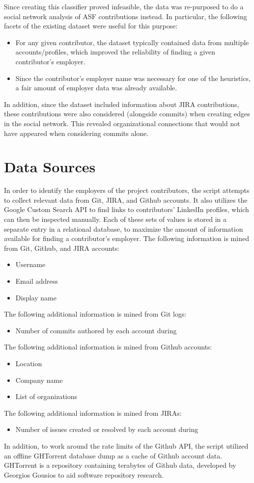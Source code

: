 Since creating this classifier proved infeasible, the data was re-purposed to do a social network analysis of ASF contributions instead. In particular, the following facets of the existing dataset were useful for this purpose:
\begin{itemize}
	\item For any given contributor, the dataset typically contained data from multiple accounts/profiles, which improved the reliability of finding a given contributor's employer.
	\item Since the contributor's employer name was necessary for one of the heuristics, a fair amount of employer data was already available.
\end{itemize}
In addition, since the dataset included information about JIRA contributions, these contributions were also considered (alongside commits) when creating edges in the social network. This revealed organizational connections that would not have appeared when considering commits alone.

\section{Data Sources}

In order to identify the employers of the project contributors, the script attempts to collect relevant data from Git, JIRA, and Github accounts. It also utilizes the Google Custom Search API to find links to contributors' LinkedIn profiles, which can then be inspected manually. Each of these sets of values is stored in a separate entry in a relational database, to maximize the amount of information available for finding a contributor's employer.
The following information is mined from Git, Github, and JIRA accounts:
\begin{itemize}
	\item Username
	\item Email address
	\item Display name
\end{itemize}
The following additional information is mined from Git logs:
\begin{itemize}
	\item Number of commits authored by each account during \timeperiod
\end{itemize}
The following additional information is mined from Github accounts:
\begin{itemize}
	\item Location
	\item Company name
	\item List of organizations
\end{itemize}
The following additional information is mined from JIRAs:
\begin{itemize}
	\item Number of issues created or resolved by each account during \timeperiod
\end{itemize}
In addition, to work around the rate limits of the Github API, the script utilized an offline GHTorrent database dump as a cache of Github account data. GHTorrent is a repository containing terabytes of Github data, developed by Georgios Gousios to aid software repository research\cite{Gousi13}.

